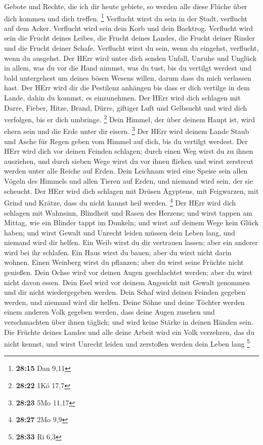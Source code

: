 Gebote und Rechte, die ich dir heute gebiete, so werden alle diese
Flüche über dich kommen und dich treffen. \footnote{\textbf{28:15} Dan
  9,11}  Verflucht wirst du sein in der Stadt, verflucht
auf dem Acker.  Verflucht wird sein dein Korb und dein
Backtrog.  Verflucht wird sein die Frucht deines Leibes,
die Frucht deines Landes, die Frucht deiner Rinder und die Frucht deiner
Schafe.  Verflucht wirst du sein, wenn du eingehst,
verflucht, wenn du ausgehst.  Der HErr wird unter dich
senden Unfall, Unruhe und Unglück in allem, was du vor die Hand nimmst,
was du tust, bis du vertilgt werdest und bald untergehest um deines
bösen Wesens willen, darum dass du mich verlassen hast. 
Der HErr wird dir die Pestilenz anhängen bis dass er dich vertilge in
dem Lande, dahin du kommst, es einzunehmen.  Der HErr
wird dich schlagen mit Darre, Fieber, Hitze, Brand, Dürre, giftiger Luft
und Gelbsucht und wird dich verfolgen, bis er dich umbringe. \footnote{\textbf{28:22}
  1Kö 17,7}  Dein Himmel, der über deinem Haupt ist, wird
ehern sein und die Erde unter dir eisern. \footnote{\textbf{28:23} 5Mo
  11,17}  Der HErr wird deinem Lande Staub und Asche für
Regen geben vom Himmel auf dich, bis du vertilgt werdest.
 Der HErr wird dich vor deinen Feinden schlagen; durch
einen Weg wirst du zu ihnen ausziehen, und durch sieben Wege wirst du
vor ihnen fliehen und wirst zerstreut werden unter alle Reiche auf
Erden.  Dein Leichnam wird eine Speise sein allen Vögeln
des Himmels und allen Tieren auf Erden, und niemand wird sein, der sie
scheucht.  Der HErr wird dich schlagen mit Drüsen
Ägyptens, mit Feigwarzen, mit Grind und Krätze, dass du nicht kannst
heil werden. \footnote{\textbf{28:27} 2Mo 9,9}  Der HErr
wird dich schlagen mit Wahnsinn, Blindheit und Rasen des Herzens;
 und wirst tappen am Mittag, wie ein Blinder tappt im
Dunkeln; und wirst auf deinem Wege kein Glück haben; und wirst Gewalt
und Unrecht leiden müssen dein Leben lang, und niemand wird dir helfen.
 Ein Weib wirst du dir vertrauen lassen; aber ein anderer
wird bei ihr schlafen. Ein Haus wirst du bauen; aber du wirst nicht
darin wohnen. Einen Weinberg wirst du pflanzen; aber du wirst seine
Früchte nicht genießen.  Dein Ochse wird vor deinen Augen
geschlachtet werden; aber du wirst nicht davon essen. Dein Esel wird vor
deinem Angesicht mit Gewalt genommen und dir nicht wiedergegeben werden.
Dein Schaf wird deinen Feinden gegeben werden, und niemand wird dir
helfen.  Deine Söhne und deine Töchter werden einem
anderen Volk gegeben werden, dass deine Augen zusehen und verschmachten
über ihnen täglich; und wird keine Stärke in deinen Händen sein.
 Die Früchte deines Landes und alle deine Arbeit wird ein
Volk verzehren, das du nicht kennst, und wirst Unrecht leiden und
zerstoßen werden dein Leben lang \footnote{\textbf{28:33} Ri 6,3}

